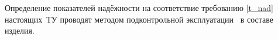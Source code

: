Определение показателей надёжности на соответствие требованию \ref{t_nad} настоящих~ТУ проводят методом подконтрольной эксплуатации \dut \ в составе изделия.